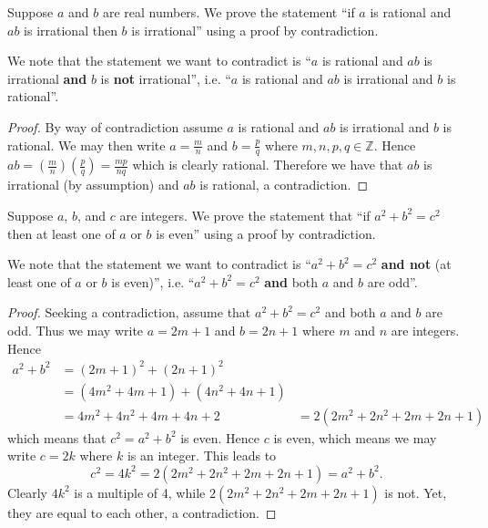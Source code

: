 \begin{example}
    Suppose $a$ and $b$ are real numbers. We prove the statement ``if $a$ is rational and $ab$ is irrational then $b$ is irrational'' using a proof by contradiction.
    
    We note that the statement we want to contradict is ``$a$ is rational and $ab$ is irrational \textbf{and} $b$ is \textbf{not} irrational'', i.e. ``$a$ is rational and $ab$ is irrational and $b$ is rational''.
    \begin{proof}
        By way of contradiction assume $a$ is rational and $ab$ is irrational and $b$ is rational. We may then write $a = \frac mn$ and $b = \frac pq$ where $m, n, p, q \in \mathbb{Z}$. Hence $ab = \left(\frac mn\right)\left(\frac pq\right) = \frac{mp}{nq}$ which is clearly rational. Therefore we have that $ab$ is irrational (by assumption) and $ab$ is rational, a contradiction.
    \end{proof}
\end{example}

\begin{example}
    Suppose $a$, $b$, and $c$ are integers. We prove the statement that ``if $a^2 + b^2 = c^2$ then at least one of $a$ or $b$ is even'' using a proof by contradiction.
    
    We note that the statement we want to contradict is ``$a^2 + b^2 = c^2$ \textbf{and not} (at least one of $a$ or $b$ is even)'', i.e. ``$a^2 + b^2 = c^2$ \textbf{and} both $a$ and $b$ are odd''.
    \begin{proof}
        Seeking a contradiction, assume that $a^2 + b^2 = c^2$ and both $a$ and $b$ are odd. Thus we may write $a = 2m + 1$ and $b = 2n + 1$ where $m$ and $n$ are integers. Hence
        \begin{align*}
            a^2 + b^2 &= (2m+1)^2 + (2n+1)^2\\
            &= (4m^2+4m+1) + (4n^2+4n+1)\\
            &= 4m^2 + 4n^2 + 4m + 4n + 2
            &= 2(2m^2 + 2n^2 + 2m + 2n +1)
        \end{align*}
        which means that $c^2 = a^2 + b^2$ is even. Hence $c$ is even, which means we may write $c = 2k$ where $k$ is an integer. This leads to
        \[
            c^2 = 4k^2 = 2(2m^2 + 2n^2 + 2m + 2n + 1) = a^2 + b^2.
        \]
        Clearly $4k^2$ is a multiple of 4, while $2(2m^2 + 2n^2 + 2m + 2n + 1)$ is not. Yet, they are equal to each other, a contradiction.
    \end{proof}
\end{example}

